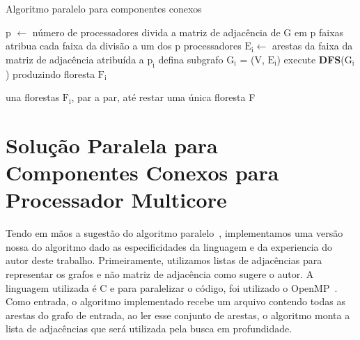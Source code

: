\documentclass[12pt]{article}
\begin{document}
\begin{algorithm}[htp!]
    \DontPrintSemicolon
    \newcommand\mycommfont[1]{\small\ttfamily{#1}}
    \caption{Algoritmo paralelo para componentes conexos}
    \label{alg_grama}
    {
        p $\gets$ número de processadores\;
        divida a matriz de adjacência de G em p faixas\;
        atribua cada faixa da divisão a um dos p processadores\;
        {
            $\text{E}_\text{i} \gets$ arestas da faixa da matriz de adjacência atribuída a $\text{p}_\text{i}$\;
            defina subgrafo $\text{G}_\text{i}$ = (V, $\text{E}_\text{i}$)\;
            execute \textbf{DFS}($\text{G}_\text{i}$) produzindo floresta $\text{F}_\text{i}$\;
        }

        una florestas $\text{F}_\text{i}$, par a par, até restar uma única floresta F\;
        
    }
\end{algorithm}

\section{Solução Paralela para Componentes Conexos para Processador Multicore}

Tendo em mãos a sugestão do algoritmo paralelo~\cite{Grama:2003}, implementamos uma versão nossa do algoritmo dado as especificidades da linguagem e da experiencia do autor deste trabalho. Primeiramente, utilizamos listas de adjacências para representar os grafos e não matriz de adjacência como sugere o autor. A linguagem utilizada é C e para paralelizar o código, foi utilizado o OpenMP~\cite{OpenMP:2018}. Como entrada, o algoritmo implementado recebe um arquivo contendo todas as arestas do grafo de entrada, ao ler esse conjunto de arestas, o algoritmo monta a lista de adjacências que será utilizada pela busca em profundidade.
 
\end{document}

